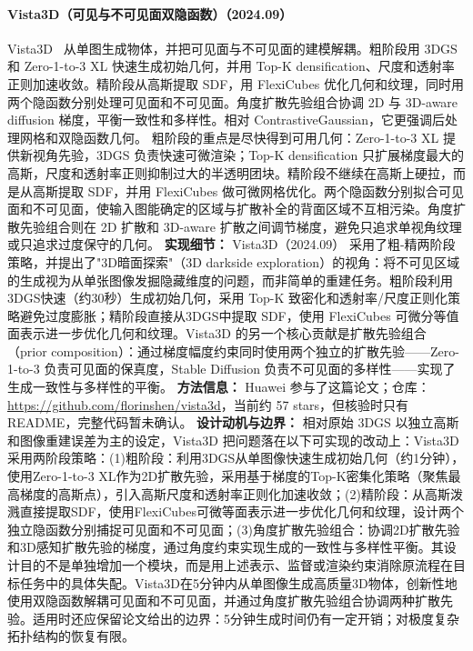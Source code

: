 \paragraph{Vista3D（可见与不可见面双隐函数）（2024.09）}
Vista3D~\cite{2409_12193} 从单图生成物体，并把可见面与不可见面的建模解耦。粗阶段用 3DGS 和 Zero-1-to-3 XL 快速生成初始几何，并用 Top-K densification、尺度和透射率正则加速收敛。精阶段从高斯提取 SDF，用 FlexiCubes 优化几何和纹理，同时用两个隐函数分别处理可见面和不可见面。角度扩散先验组合协调 2D 与 3D-aware diffusion 梯度，平衡一致性和多样性。相对 ContrastiveGaussian，它更强调后处理网格和双隐函数几何。
粗阶段的重点是尽快得到可用几何：Zero-1-to-3 XL 提供新视角先验，3DGS 负责快速可微渲染；Top-K densification 只扩展梯度最大的高斯，尺度和透射率正则抑制过大的半透明团块。精阶段不继续在高斯上硬拉，而是从高斯提取 SDF，并用 FlexiCubes 做可微网格优化。两个隐函数分别拟合可见面和不可见面，使输入图能确定的区域与扩散补全的背面区域不互相污染。角度扩散先验组合则在 2D 扩散和 3D-aware 扩散之间调节梯度，避免只追求单视角纹理或只追求过度保守的几何。
\textbf{实现细节：} Vista3D（2024.09） 采用了粗-精两阶段策略，并提出了"3D暗面探索"（3D darkside exploration）的视角：将不可见区域的生成视为从单张图像发掘隐藏维度的问题，而非简单的重建任务。粗阶段利用3DGS快速（约30秒）生成初始几何，采用 Top-K 致密化和透射率/尺度正则化策略避免过度膨胀；精阶段直接从3DGS中提取 SDF，使用 FlexiCubes 可微分等值面表示进一步优化几何和纹理。Vista3D 的另一个核心贡献是扩散先验组合（prior composition）：通过梯度幅度约束同时使用两个独立的扩散先验——Zero-1-to-3 负责可见面的保真度，Stable Diffusion 负责不可见面的多样性——实现了生成一致性与多样性的平衡。
\textbf{方法信息：} Huawei 参与了这篇论文；仓库：\url{https://github.com/florinshen/vista3d}，当前约 57 stars，但核验时只有 README，完整代码暂未确认。
\textbf{设计动机与边界：} 相对原始 3DGS 以独立高斯和图像重建误差为主的设定，Vista3D 把问题落在以下可实现的改动上：Vista3D采用两阶段策略：(1)粗阶段：利用3DGS从单图像快速生成初始几何（约1分钟），使用Zero-1-to-3 XL作为2D扩散先验，采用基于梯度的Top-K密集化策略（聚焦最高梯度的高斯点），引入高斯尺度和透射率正则化加速收敛；(2)精阶段：从高斯泼溅直接提取SDF，使用FlexiCubes可微等面表示进一步优化几何和纹理，设计两个独立隐函数分别捕捉可见面和不可见面；(3)角度扩散先验组合：协调2D扩散先验和3D感知扩散先验的梯度，通过角度约束实现生成的一致性与多样性平衡。其设计目的不是单独增加一个模块，而是用上述表示、监督或渲染约束消除原流程在目标任务中的具体失配。Vista3D在5分钟内从单图像生成高质量3D物体，创新性地使用双隐函数解耦可见面和不可见面，并通过角度扩散先验组合协调两种扩散先验。适用时还应保留论文给出的边界：5分钟生成时间仍有一定开销；对极度复杂拓扑结构的恢复有限。
